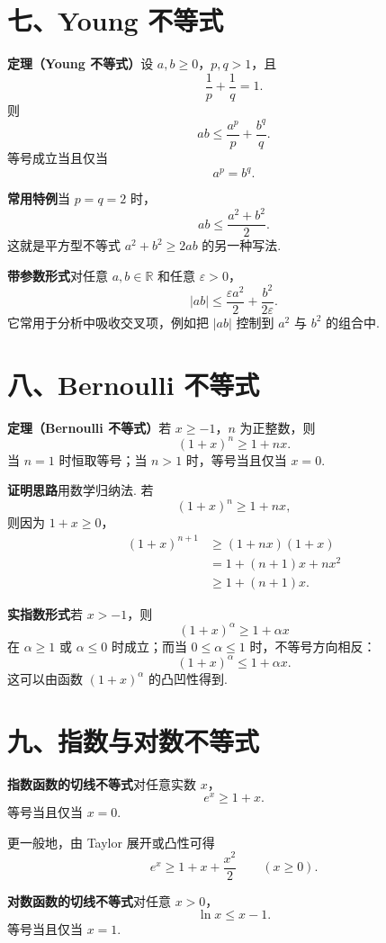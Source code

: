 \documentclass[UTF8, 12pt, fontset=fandol, oneside]{ctexart}
\begin{document}
\section*{七、Young 不等式}

\noindent\textbf{定理（Young 不等式）}\quad 设 $a,b\ge0$，$p,q>1$，且
\[
  \frac1p+\frac1q=1.
\]
则
\[
  ab\le \frac{a^p}{p}+\frac{b^q}{q}.
\]
等号成立当且仅当
\[
  a^p=b^q.
\]

\noindent\textbf{常用特例}\quad 当 $p=q=2$ 时，
\[
  ab\le \frac{a^2+b^2}{2}.
\]
这就是平方型不等式 $a^2+b^2\ge2ab$ 的另一种写法.

\noindent\textbf{带参数形式}\quad 对任意 $a,b\in\mathbb R$ 和任意 $\varepsilon>0$，
\[
  |ab|\le \frac{\varepsilon a^2}{2}+\frac{b^2}{2\varepsilon}.
\]
它常用于分析中吸收交叉项，例如把 $|ab|$ 控制到 $a^2$ 与 $b^2$ 的组合中.

\section*{八、Bernoulli 不等式}

\noindent\textbf{定理（Bernoulli 不等式）}\quad 若 $x\ge -1$，$n$ 为正整数，则
\[
  (1+x)^n\ge1+nx.
\]
当 $n=1$ 时恒取等号；当 $n>1$ 时，等号当且仅当 $x=0$.

\noindent\textbf{证明思路}\quad 用数学归纳法. 若
\[
  (1+x)^n\ge1+nx,
\]
则因为 $1+x\ge0$，
\[
\begin{aligned}
  (1+x)^{n+1}
  &\ge (1+nx)(1+x)\\
  &=1+(n+1)x+nx^2\\
  &\ge1+(n+1)x.
\end{aligned}
\]

\noindent\textbf{实指数形式}\quad 若 $x>-1$，则
\[
  (1+x)^\alpha\ge1+\alpha x
\]
在 $\alpha\ge1$ 或 $\alpha\le0$ 时成立；而当 $0\le\alpha\le1$ 时，不等号方向相反：
\[
  (1+x)^\alpha\le1+\alpha x.
\]
这可以由函数 $(1+x)^\alpha$ 的凸凹性得到.

\section*{九、指数与对数不等式}

\noindent\textbf{指数函数的切线不等式}\quad 对任意实数 $x$，
\[
  e^x\ge1+x.
\]
等号当且仅当 $x=0$.

更一般地，由 Taylor 展开或凸性可得
\[
  e^x\ge1+x+\frac{x^2}{2}\qquad(x\ge0).
\]

\noindent\textbf{对数函数的切线不等式}\quad 对任意 $x>0$，
\[
  \ln x\le x-1.
\]
等号当且仅当 $x=1$.
\end{document}
